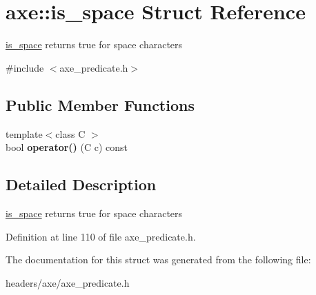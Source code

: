 \hypertarget{structaxe_1_1is__space}{\section{axe\+:\+:is\+\_\+space Struct Reference}
\label{structaxe_1_1is__space}
}


\hyperlink{structaxe_1_1is__space}{is\+\_\+space} returns true for space characters  




{\ttfamily \#include $<$axe\+\_\+predicate.\+h$>$}

\subsection*{Public Member Functions}
\begin{DoxyCompactItemize}
\item 
\hypertarget{structaxe_1_1is__space_a88328e295df1b5ebae1da6242a9640ac}{{\footnotesize template$<$class C $>$ }\\bool {\bfseries operator()} (C c) const }\label{structaxe_1_1is__space_a88328e295df1b5ebae1da6242a9640ac}

\end{DoxyCompactItemize}


\subsection{Detailed Description}
\hyperlink{structaxe_1_1is__space}{is\+\_\+space} returns true for space characters 

Definition at line 110 of file axe\+\_\+predicate.\+h.



The documentation for this struct was generated from the following file\+:\begin{DoxyCompactItemize}
\item 
headers/axe/axe\+\_\+predicate.\+h\end{DoxyCompactItemize}
